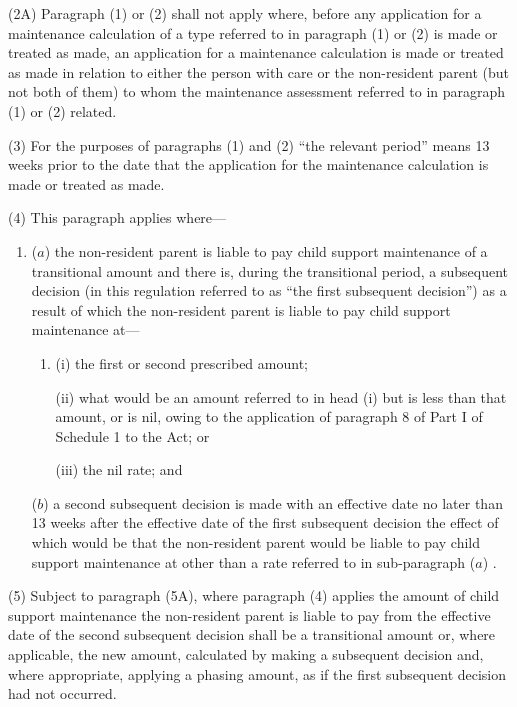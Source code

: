 \documentclass[12pt,a4paper]{article}
\begin{document}
(2A) Paragraph (1) or (2) shall not apply where, before any application for a maintenance calculation of a type referred to in paragraph (1) or (2) is made or treated as made, an application for a maintenance calculation is made or treated as made in relation to either the person with care or the non-resident parent (but not both of them) to whom the maintenance assessment referred to in paragraph (1) or (2) related.

(3) For the purposes of paragraphs (1) and (2) “the relevant period” means 13 weeks prior to the date that the application for the maintenance calculation is made or treated as made.

(4) This paragraph applies where—
\begin{enumerate}\item[]
($a$) the non-resident parent is liable to pay child support maintenance of a transitional amount and there is, during the transitional period, a subsequent decision (in this regulation referred to as “the first subsequent decision”) as a result of which the non-resident parent is liable to pay child support maintenance 
at—
\begin{enumerate}\item[]
    (i) 
    the first or second prescribed amount;

    (ii) 
    what would be an amount referred to in head (i)  but is less than that amount, or is nil, owing to the application of paragraph 8 of Part I of Schedule 1 to the Act; or

    (iii) 
    the nil rate; and 
\end{enumerate}  %

($b$) a second subsequent decision is made with an effective date no later than 13 weeks after the effective date of the first subsequent decision the effect of which would be that the non-resident parent would be liable to pay child support maintenance at other than 
a rate referred to in sub-paragraph ($a$)%
.
\end{enumerate}

(5) 
Subject to paragraph (5A), where  %
paragraph (4) applies the amount of child support maintenance the non-resident parent is liable to pay from the effective date of the second subsequent decision shall be a transitional amount or, where applicable, the new amount, calculated by making a subsequent decision and, where appropriate, applying a phasing amount, as if the first subsequent decision had not occurred.
\end{document}

